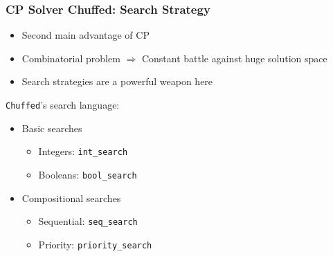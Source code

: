 \documentclass{beamer}
\begin{document}
\begin{frame}
\frametitle{CP Solver Chuffed: Search Strategy}
\begin{itemize}
	\item Second main advantage of CP\vspace{1mm}
	\item Combinatorial problem $\Rightarrow$ Constant battle against huge solution space\vspace{1mm}\pause
	\item Search strategies are a powerful weapon here\pause
\end{itemize}
\vspace{3mm}
{\tt Chuffed}'s search language:\vspace{2mm}\pause
\begin{itemize}
	\item Basic searches\vspace{1mm}
	\begin{itemize}
		\item Integers: {\tt int\_search}\vspace{1mm}
		\item Booleans: {\tt bool\_search}\vspace{2mm}\pause
	\end{itemize}
	\item Compositional searches\vspace{1mm}
	\begin{itemize}
		\item Sequential: {\tt seq\_search}\vspace{1mm}
		\item Priority: {\tt priority\_search}
	\end{itemize}
\end{itemize}
\end{frame}
\end{document}
